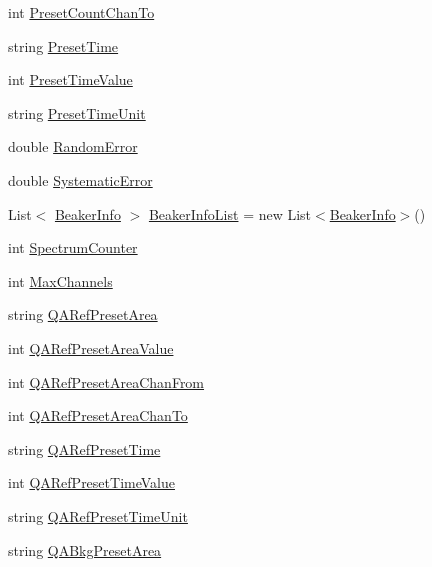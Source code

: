 \begin{DoxyCompactItemize}
int \hyperlink{class_scintilab_1_1_detector_a8c6bbd8aa7b67aca463d5f82c5933357}{Preset\+Count\+Chan\+To}
\item 
string \hyperlink{class_scintilab_1_1_detector_a8d3d6f5bd3c9e99dd5b20a34b2bcb6cf}{Preset\+Time}
\item 
int \hyperlink{class_scintilab_1_1_detector_aa68a1c461c3f964591f67d409463fb86}{Preset\+Time\+Value}
\item 
string \hyperlink{class_scintilab_1_1_detector_a958e4c02e11a81e23684e08789f648d7}{Preset\+Time\+Unit}
\item 
double \hyperlink{class_scintilab_1_1_detector_a6f60db064b575425d4e4fd161a8d7a99}{Random\+Error}
\item 
double \hyperlink{class_scintilab_1_1_detector_aff4481284f02b788607bbcf9d55f3880}{Systematic\+Error}
\item 
List$<$ \hyperlink{class_scintilab_1_1_beaker_info}{Beaker\+Info} $>$ \hyperlink{class_scintilab_1_1_detector_a2f6a3c3e640fe73d7bf19650b5f967ee}{Beaker\+Info\+List} = new List$<$\hyperlink{class_scintilab_1_1_beaker_info}{Beaker\+Info}$>$()
\item 
int \hyperlink{class_scintilab_1_1_detector_a94d125f00803b002bc7b6be2c3fe2bd1}{Spectrum\+Counter}
\item 
int \hyperlink{class_scintilab_1_1_detector_a3292810e6f1dd86ceeb6e11da3389657}{Max\+Channels}
\item 
string \hyperlink{class_scintilab_1_1_detector_afb02ab8b47ade4b8d4eb807e7097a503}{Q\+A\+Ref\+Preset\+Area}
\item 
int \hyperlink{class_scintilab_1_1_detector_ab82ce8a7a4a8e4e0db88b373242b5363}{Q\+A\+Ref\+Preset\+Area\+Value}
\item 
int \hyperlink{class_scintilab_1_1_detector_ab2e5f6f0e3e6e575e9165235f83b4ee6}{Q\+A\+Ref\+Preset\+Area\+Chan\+From}
\item 
int \hyperlink{class_scintilab_1_1_detector_ac6eb4aa3048ab3c3647b4c7e9780e6e8}{Q\+A\+Ref\+Preset\+Area\+Chan\+To}
\item 
string \hyperlink{class_scintilab_1_1_detector_ace8481fd14039fef7f3a57994006d8dd}{Q\+A\+Ref\+Preset\+Time}
\item 
int \hyperlink{class_scintilab_1_1_detector_a500c172c5f373324cde145a6b80ec565}{Q\+A\+Ref\+Preset\+Time\+Value}
\item 
string \hyperlink{class_scintilab_1_1_detector_a18c26c628f016362d684ec53dec7b415}{Q\+A\+Ref\+Preset\+Time\+Unit}
\item 
string \hyperlink{class_scintilab_1_1_detector_a4546f591a7c043c96940efb203952d45}{Q\+A\+Bkg\+Preset\+Area}

\end{DoxyCompactItemize}
